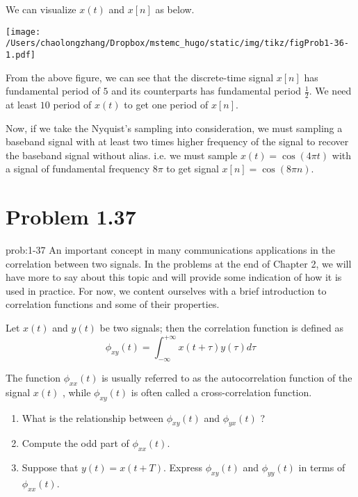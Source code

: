\documentclass[koma,a4paper,utopia,12pt,listings-color,microtype,paralist,colorlinks,urlcolor=red]{org-article}
\begin{document}
We can visualize \(x(t)\) and \(x[n]\) as below.

\begin{center}
\texttt{[image: /Users/chaolongzhang/Dropbox/mstemc\_hugo/static/img/tikz/figProb1-36-1.pdf]}
\end{center}

From the above figure, we can see that the discrete-time signal \(x[n]\) has
fundamental period of \(5\) and its counterparts has fundamental period
\(\frac{1}{2}\). We need at least \(10\) period of \(x(t)\) to get one period of
\(x[n]\).

Now, if we take the Nyquist's sampling into consideration, we must sampling a
baseband signal with at least two times higher frequency of the signal to
recover the baseband signal without alias. i.e. we must sample \(x(t) =
\cos(4\pi t)\) with a signal of fundamental frequency \(8\pi\) to get signal
\(x[n] = \cos(8\pi n)\).
\section{Problem 1.37}
\label{sec:org5b0c999}


\begin{prob}[]{prob:1-37}
An important concept in many communications applications in the correlation
between two signals. In the problems at the end of Chapter 2, we will have
more to say about this topic and will provide some indication of how it is
used in practice. For now, we content ourselves with a brief introduction to
correlation functions and some of their properties.

Let \(x(t)\) and \(y(t)\) be two signals; then the correlation function is
defined as
\begin{equation*}
\phi_{xy}(t) = \int_{-\infty}^{+\infty} x(t+ \tau) y(\tau)d\tau
\end{equation*}

The function \(\phi_{xx}(t)\) is usually referred to as the autocorrelation
function of the signal \(x(t)\) , while \(\phi_{xy}(t)\) is often called a
cross-correlation function.

\begin{enumerate}
\item What is the relationship between \(\phi_{xy}(t)\) and \(\phi_{yx}(t)\) ?
\item Compute the odd part of \(\phi_{xx}(t)\).
\item Suppose that \(y(t)= x(t+ T)\). Express \(\phi_{xy}(t)\) and
\(\phi_{yy}(t)\) in terms of \(\phi_{xx}(t)\).
\end{enumerate}
\label{prob:1-37}
\end{prob}
\end{document}
